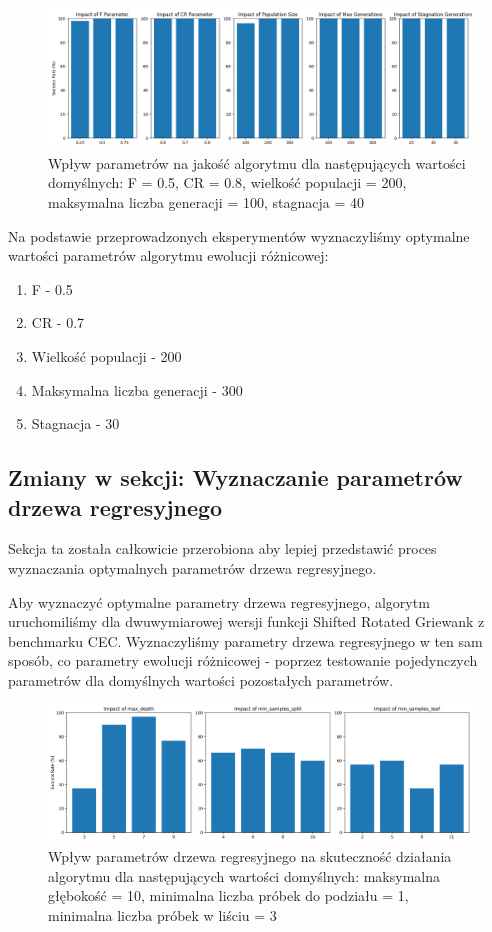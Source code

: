 \documentclass{article}
\begin{document}
\begin{figure}[H]
    \centering
    \includegraphics[width=\textwidth]{parameter_tuning_results_separate4.png}
    \caption{Wpływ parametrów na jakość algorytmu dla następujących wartości domyślnych: F = 0.5, CR = 0.8, wielkość populacji = 200, maksymalna liczba generacji = 100, stagnacja = 40}
    \label{fig:parameter_results4}
\end{figure}

Na podstawie przeprowadzonych eksperymentów wyznaczyliśmy optymalne wartości parametrów algorytmu ewolucji różnicowej:
\begin{enumerate}
    \item F - 0.5
    \item CR - 0.7
    \item Wielkość populacji - 200
    \item Maksymalna liczba generacji - 300
    \item Stagnacja - 30
\end{enumerate}

\subsection{Zmiany w sekcji: Wyznaczanie parametrów drzewa regresyjnego}

Sekcja ta została całkowicie przerobiona aby lepiej przedstawić proces wyznaczania optymalnych parametrów drzewa regresyjnego.

Aby wyznaczyć optymalne parametry drzewa regresyjnego, algorytm uruchomiliśmy dla dwuwymiarowej wersji funkcji Shifted Rotated Griewank z benchmarku CEC. Wyznaczyliśmy parametry drzewa regresyjnego w ten sam sposób, co parametry ewolucji różnicowej - poprzez testowanie pojedynczych parametrów dla domyślnych wartości pozostałych parametrów.

\begin{figure}[H]
    \centering
    \includegraphics[width=\textwidth]{tree_parameter_tuning_separate_results2.png}
    \caption{Wpływ parametrów drzewa regresyjnego na skuteczność działania algorytmu dla następujących wartości domyślnych: maksymalna głębokość = 10, minimalna liczba próbek do podziału = 1, minimalna liczba próbek w liściu = 3}
    \label{fig:tree_parameter_results1}
\end{figure}
\end{document}
